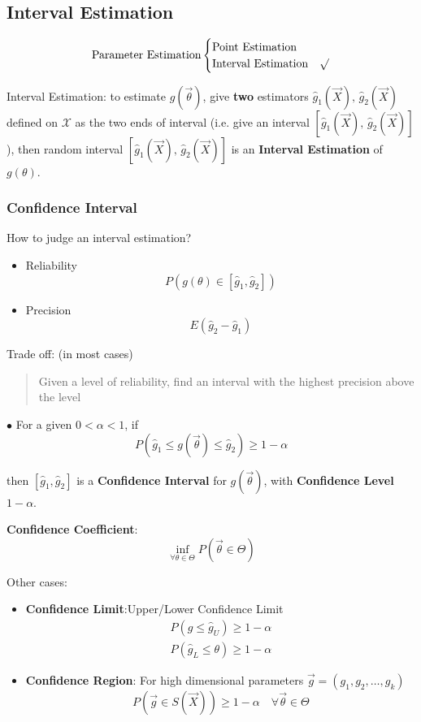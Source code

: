 \documentclass[11pt,a4paper]{ctexart}
\numberwithin{equation}{section}%
\begin{document}
\subsection{Interval Estimation}\label{SectionIntervalEstimation}
\[
    \text{Parameter Estimation}\begin{cases}
        \text{Point Estimation}& \\
        \text{Interval Estimation}& \surd
    \end{cases}    
\]

    Interval Estimation: to estimate $g(\vec{\theta})$, give \textbf{two} estimators $\hat{g}_1(\vec{X}),\, \hat{g}_2(\vec{X})$ defined on $\mathscr{X}$ as the two ends of interval (i.e. give an interval $[\hat{g}_1(\vec{X}),\, \hat{g}_2(\vec{X})]$), then random interval $[\hat{g}_1(\vec{X}),\, \hat{g}_2(\vec{X})]$ is an \textbf{Interval Estimation} of $g(\theta)$.

    \subsubsection{Confidence Interval}\label{SubSectionConfidenceInterval}
    How to judge an interval estimation?
    \begin{itemize}
        \item Reliability
        \[P(g(\theta)\in[\hat{g}_1,\hat{g}_2])\]
        \item Precision
        \[E(\hat{g}_2-\hat{g}_1)\]
    \end{itemize}

    Trade off: (in most cases)
    \begin{quote}
        Given a level of reliability, find an interval with the highest precision above the level
    \end{quote}

    $\bullet$ For a given $0<\alpha<1$, if 
    \[
        P(\hat{g}_1\leq g(\vec{\theta})\leq \hat{g}_2)\geq 1-\alpha
    \]

    then $[\hat{g}_1,\hat{g}_2]$ is a \textbf{Confidence Interval} for $g(\vec{\theta})$, with \textbf{Confidence Level} $1-\alpha$. 
    
    \textbf{Confidence Coefficient}:
    \[\inf_{\forall\theta\in\Theta}P(
        \vec{\theta}\in\Theta
    )\]

    Other cases:
    \begin{itemize}[topsep=-4pt]
        \item \textbf{Confidence Limit}:Upper/Lower Confidence Limit
    \begin{align*}
        P(g\leq \hat{g}_U)\geq 1-\alpha\\
        P(\hat{g}_L\leq \theta)\geq 1-\alpha
    \end{align*}
        \item \textbf{Confidence Region}: For high dimensional parameters $\vec{g}=(g_1,g_2,\ldots,g_k)$
        \[P(\vec{g}\in S(\vec{X}))\geq 1-\alpha\quad \forall \vec{\theta}\in\Theta \]
        
    \end{itemize}
\end{document}
